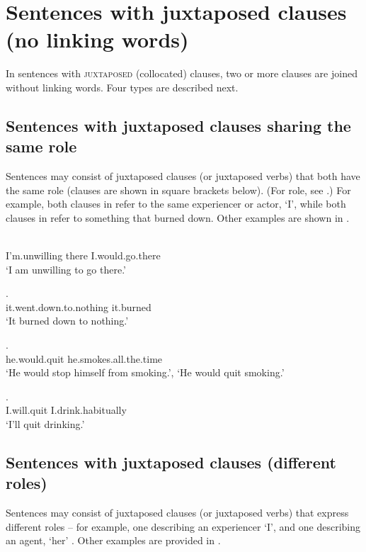 \chapter{Sentences with juxtaposed clauses (no linking words)} \label{Sentences with side-by-side clauses}
In sentences with \textsc{juxtaposed} (collocated) clauses, two or more clauses are joined without linking words. Four types are described next. 

\section{Sentences with juxtaposed clauses sharing the same role} \label{Sentences with side-by-side clauses sharing the same role}
Sentences may consist of juxtaposed clauses (or juxtaposed verbs) that both have the same role (clauses are shown in square brackets below). (For role, see .) For example, both clauses in  refer to the same experiencer or actor, ‘I’, while both clauses in  refer to something that burned down. Other examples are shown in .

\ea\label{ex:sidebysidex} 
\gll [dewagegaę́hs] [to há:ge:ˀ] \\
I’m.unwilling there I.would.go.there\\
\glt ‘I am unwilling to go there.’ 
\z

\ea\label{ex:sidebysidex2} 
.\\
it.went.down.to.nothing it.burned\\
\glt ‘It burned down to nothing.’
\z

\ea\label{ex:sidebysidex3} 
\gll [A:hęni:hę́:ˀ] [hahjáotaˀ].\\
 he.would.quit he.smokes.all.the.time\\
\glt ‘He would stop himself from smoking.’, ‘He would quit smoking.’
\z

\ea\label{ex:sidebysidex300} 
\gll [Ęgęni̱hę́:ˀ] [knegéhaˀ].\\
 I.will.quit I.drink.habitually\\
\glt ‘I’ll quit drinking.’
\z


\section{Sentences with juxtaposed clauses (different roles)} \label{Sentences with side-by-side clauses (different roles)}
Sentences may consist of juxtaposed clauses (or juxtaposed verbs) that express different roles -- for example, one describing an experiencer ‘I’, and one describing an agent, ‘her’ . Other examples are provided in .  

